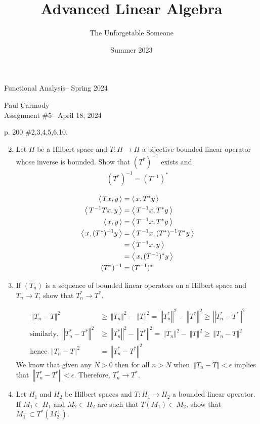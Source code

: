 \documentclass[10pt,a4paper]{report}
\title{Advanced Linear Algebra}
\author{The Unforgetable Someone}
\date{Summer 2023}
\newcommand{\CLASSNAME}{Functional Analysis}
\newcommand{\STUDENTNAME}{Paul Carmody}
\newcommand{\ASSIGNMENT}{Assignment \#5}
\newcommand{\DUEDATE}{April 18, 2024}
\newcommand{\SEMESTER}{Spring 2024}
\newcommand{\NORM}[1]{\,\left \Vert #1 \right \Vert}
\begin{document}
\begin{center}
	\Large{\CLASSNAME -- \SEMESTER} \\
\end{center}
\begin{center}
	\STUDENTNAME \\
	\ASSIGNMENT -- \DUEDATE\\
\end{center} 

p. 200 \#2,3,4,5,6,10. 
\begin{enumerate}
	\setcounter{enumi}{1}
	\item Let $H$ be a Hilbert space and $T: H \to H$ a bijective bounded linear operator whose inverse is bounded.  Show that $(T^*)^{-1}$ exists and 
	\begin{align*}
		(T^*)^{-1}=(T^{-1})^*
	\end{align*}
	
	\begin{align*}
		\left \langle\, Tx, y \,\right \rangle &= \left \langle\, x, T^*y \,\right \rangle\\
		\left \langle\, T^{-1}Tx, y \,\right \rangle &= \left \langle\, T^{-1}x, T^*y \,\right \rangle\\
		\left \langle\, x,y \,\right \rangle &= \left \langle\, T^{-1}x, T^*y \,\right \rangle\\
		\left \langle\, x, (T^*)^{-1}y \,\right \rangle &= \left \langle\, T^{-1}x, (T^*)^{-1}T^*y \,\right \rangle\\
		&= \left \langle\, T^{-1}x, y \,\right \rangle \\
		&= \left \langle\, x, (T^{-1})^*y \,\right \rangle \\
		(T^*)^{-1}&=(T^{-1})^*
	\end{align*}
	
	\item If $(T_n)$ is a sequence of bounded linear operators on a Hilbert space and $T_n \to T$, show that $T_n^*\to T^*$.
	
	\begin{align*}
		\NORM{T_n -T}^2 &\ge \NORM{T_n}^2 - \NORM{T}^2 = \NORM{T_n^*}^2 - \NORM{T^*}^2 \ge \NORM{T_n^*-T^*}^2\\
		\text{similarly, }  \NORM{T_n^*-T^*}^2 &\ge  \NORM{T_n^*}^2 - \NORM{T^*}^2 = \NORM{T_n}^2 - \NORM{T}^2 \ge \NORM{T_n -T}^2 \\
		\text{hence } \NORM{T_n -T}^2 &= \NORM{T_n^*-T^*}^2
	\end{align*}	We know that given any $N>0$ then for all $n > N$ when $\NORM{T_n -T} < \epsilon$ implies that $\NORM{T_n^*-T^*}<\epsilon$.  Therefore, $T_n^* \to T^*$.
	
	\item Let $H_1$ and $H_2$ be Hilbert spaces and $T: H_1 \to H_2$ a bounded linear operator.  If $M_1\subset H_1$ and $M_2 \subset H_2$ are such that $T(M_1) \subset M_2$, show that $M_1^\perp \subset T^*(M_2^\perp)$.
	

\end{enumerate}
\end{document}
